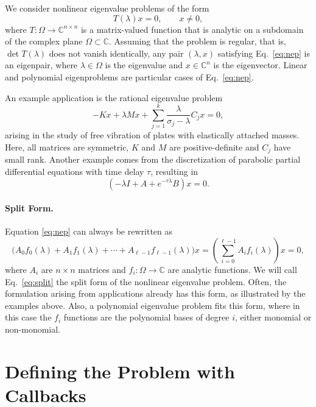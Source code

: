 We consider nonlinear eigenvalue problems of the form
\begin{equation}
T(\lambda)x=0,\qquad x\neq 0,\label{eq:nep}
\end{equation}
where $T:\Omega\rightarrow\mathbb{C}^{n\times n}$ is a matrix-valued function that is analytic on a subdomain of the complex plane $\Omega\subset\mathbb{C}$. Assuming that the problem is regular, that is, $\det T(\lambda)$ does not vanish identically, any pair $(\lambda,x)$ satisfying Eq.\ \ref{eq:nep} is an eigenpair, where $\lambda\in\Omega$ is the eigenvalue and $x\in\mathbb{C}^n$ is the eigenvector. Linear and polynomial eigenproblems are particular cases of Eq.\ \ref{eq:nep}.

An example application is the rational eigenvalue problem
\begin{equation}
-Kx+\lambda Mx+\sum_{j=1}^k\frac{\lambda}{\sigma_j-\lambda}C_jx=0,\label{eq:rep}
\end{equation}
arising in the study of free vibration of plates with elastically attached masses. Here, all matrices are symmetric, $K$ and $M$ are positive-definite and $C_j$ have small rank.
Another example comes from the discretization of parabolic partial differential equations with time delay $\tau$, resulting in
\begin{equation}
(-\lambda I + A + e^{-\tau\lambda}B)x = 0.\label{eq:delay}
\end{equation}

\paragraph{Split Form.}
Equation \ref{eq:nep} can always be rewritten as
\begin{equation}
\big(A_0f_0(\lambda)+A_1f_1(\lambda)+\cdots+A_{\ell-1}f_{\ell-1}(\lambda)\big)x=
\left(\sum_{i=0}^{\ell-1}A_if_i(\lambda)\right)x = 0,\label{eq:split}
\end{equation}
where $A_i$ are $n\times n$ matrices and $f_i:\Omega\rightarrow\mathbb{C}$ are analytic functions. We will call Eq.\ \ref{eq:split} the split form of the nonlinear eigenvalue problem. Often, the formulation arising from applications already has this form, as illustrated by the examples above. Also, a polynomial eigenvalue problem fits this form, where in this case the $f_i$ functions are the polynomial bases of degree $i$, either monomial or non-monomial.

\section{\label{sec:nepjac}Defining the Problem with Callbacks}

